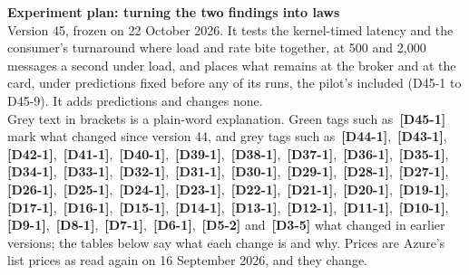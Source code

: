 \documentclass[11pt]{article}
\newcommand{\chg}[1]{\,{\color{chgcol}\bfseries\footnotesize[#1]}}
\newcommand{\chgold}[1]{\,{\color{oldcol}\bfseries\footnotesize[#1]}}
\begin{document}
{\LARGE\bfseries Experiment plan: turning the two findings into laws}\\[3pt]
{\large Version 45, frozen on 22 October 2026. It tests the kernel-timed latency and the consumer's turnaround where load and rate bite together, at 500 and 2,000 messages a second under load, and places what remains at the broker and at the card, under predictions fixed before any of its runs, the pilot's included (D45-1 to D45-9). It adds predictions and changes none.}\\[4pt]
{\color{soft}\small Grey text in brackets is a plain-word explanation. Green tags such as \chg{D45-1} mark what changed since version 44, and grey tags such as \chgold{D44-1}, \chgold{D43-1}, \chgold{D42-1}, \chgold{D41-1}, \chgold{D40-1}, \chgold{D39-1}, \chgold{D38-1}, \chgold{D37-1}, \chgold{D36-1}, \chgold{D35-1}, \chgold{D34-1}, \chgold{D33-1}, \chgold{D32-1}, \chgold{D31-1}, \chgold{D30-1}, \chgold{D29-1}, \chgold{D28-1}, \chgold{D27-1}, \chgold{D26-1}, \chgold{D25-1}, \chgold{D24-1}, \chgold{D23-1}, \chgold{D22-1}, \chgold{D21-1}, \chgold{D20-1}, \chgold{D19-1}, \chgold{D17-1}, \chgold{D16-1}, \chgold{D15-1}, \chgold{D14-1}, \chgold{D13-1}, \chgold{D12-1}, \chgold{D11-1}, \chgold{D10-1}, \chgold{D9-1}, \chgold{D8-1}, \chgold{D7-1}, \chgold{D6-1}, \chgold{D5-2} and \chgold{D3-5} what changed in earlier versions; the tables below say what each change is and why. Prices are Azure's list prices as read again on 16 September 2026, and they change.}
\end{document}
